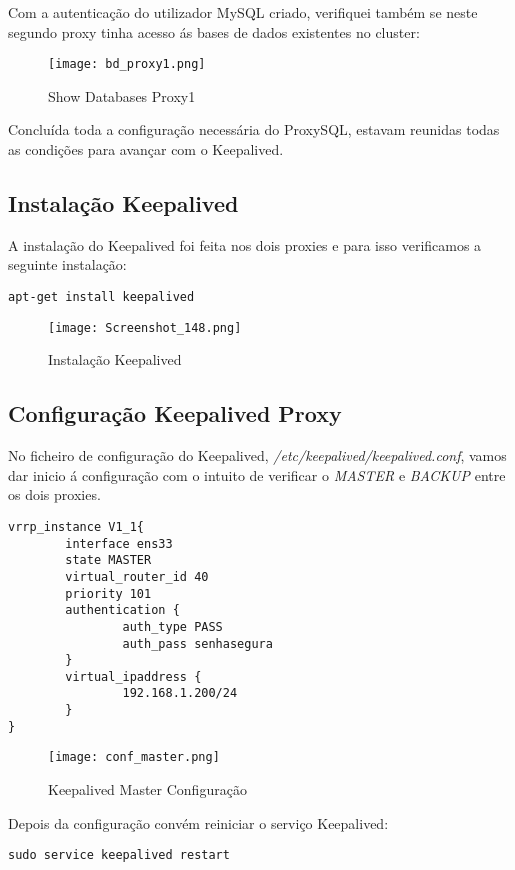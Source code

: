 Com a autenticação do utilizador MySQL criado, verifiquei também se neste segundo proxy tinha acesso ás bases de dados existentes no cluster:

\begin{figure}[H]
\center
\texttt{[image: bd\_proxy1.png]}
\caption{Show Databases Proxy1}
\end{figure}

Concluída toda a configuração necessária do ProxySQL, estavam reunidas todas as condições para avançar com o Keepalived.

\newpage
\subsection{Instalação Keepalived}
A instalação do Keepalived foi feita nos dois proxies e para isso verificamos a seguinte instalação:

\begin{verbatim}apt-get install keepalived\end{verbatim}

\begin{figure}[H]
\center
\texttt{[image: Screenshot\_148.png]}
\caption{Instalação Keepalived}
\end{figure}

\newpage
\subsection{Configuração Keepalived Proxy}
No ficheiro de configuração do Keepalived, \textit{/etc/keepalived/keepalived.conf}, vamos dar inicio á configuração com o intuito de verificar o \textit{MASTER} e \textit{BACKUP} entre os dois proxies.

\begin{verbatim}vrrp_instance V1_1{
        interface ens33
        state MASTER
        virtual_router_id 40
        priority 101
        authentication {
                auth_type PASS
                auth_pass senhasegura
        }       
        virtual_ipaddress {
                192.168.1.200/24
        }
}\end{verbatim}

\begin{figure}[H]
\center
\texttt{[image: conf\_master.png]}
\caption{Keepalived Master Configuração}
\end{figure}

Depois da configuração convém reiniciar o serviço Keepalived:
\begin{verbatim}sudo service keepalived restart\end{verbatim}

